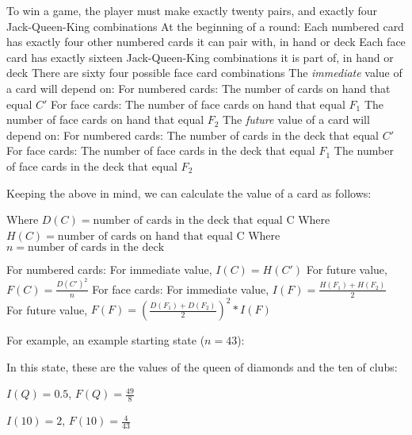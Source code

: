 \documentclass{article}
\begin{document}
\begin{outline}
  \1 To win a game, the player must make exactly twenty pairs, and exactly four Jack-Queen-King combinations
  \1 At the beginning of a round:
    \2 Each numbered card has exactly four other numbered cards it can pair with, in hand or deck
    \2 Each face card has exactly sixteen Jack-Queen-King combinations it is part of, in hand or deck
    \2 There are sixty four possible face card combinations
  \1 The \emph{immediate} value of a card will depend on:
    \2 For numbered cards:
      \3 The number of cards on hand that equal $C'$
    \2 For face cards:
      \3 The number of face cards on hand that equal $F_1$
      \3 The number of face cards on hand that equal $F_2$
  \1 The \emph{future} value of a card will depend on:
    \2 For numbered cards:
      \3 The number of cards in the deck that equal $C'$
    \2 For face cards:
      \3 The number of face cards in the deck that equal $F_1$
      \3 The number of face cards in the deck that equal $F_2$
\end{outline}

Keeping the above in mind, we can calculate the value of a card as follows:

\begin{outline}
  \1 Where $D(C) = \text{number of cards in the deck that equal C}$
  \1 Where $H(C) = \text{number of cards on hand that equal C}$
  \1 Where $n = \text{number of cards in the deck}$
\end{outline}

\begin{outline}
  \1 For numbered cards:
    \2 For immediate value, $I(C) = H(C')$
    \2 For future value, $F(C) = \frac{D(C')^2}{n}$
  \1 For face cards:
    \2 For immediate value, $I(F) = \frac{H(F_1) + H(F_2)}{2}$
    \2 For future value, $F(F) = (\frac{D(F_1) + D(F_2)}{2})^2 * I(F)$
\end{outline}

For example, an example starting state ($n = 43$):

\vspace{3mm}


\vspace{3mm}

In this state, these are the values of the queen of diamonds and the ten of clubs:

$I(Q) = 0.5$, $F(Q) = \frac{49}{8}$

$I(10) = 2$, $F(10) = \frac{4}{43}$
\end{document}
